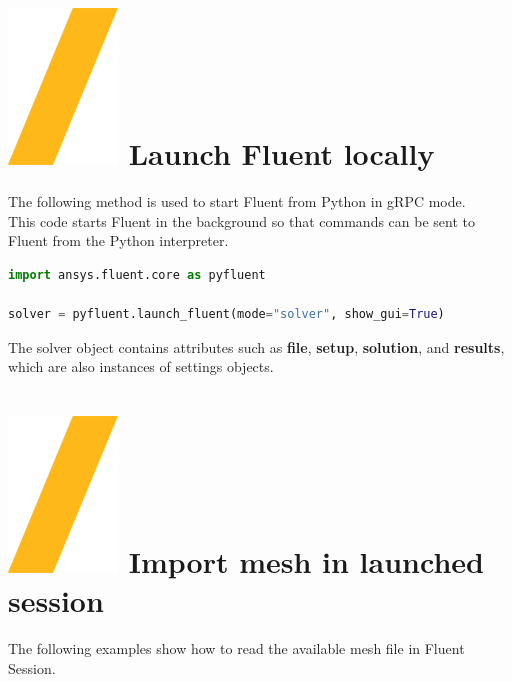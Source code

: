\documentclass[9pt,landscape]{article}
\begin{document}
\begin{multicols}{3}
\setlength{\premulticols}{1pt}
\setlength{\postmulticols}{1pt}
\setlength{\multicolsep}{1pt}
\setlength{\columnsep}{2pt}

\vfill
\section{\includegraphics[height=\fontcharht\font`\S]{slash.png} Launch Fluent locally}
The following method is used to start Fluent from Python in gRPC mode.\\
This code starts Fluent in the background so that commands can be sent to Fluent from the Python interpreter.

\begin{lstlisting}[language=Python]
import ansys.fluent.core as pyfluent

solver = pyfluent.launch_fluent(mode="solver", show_gui=True)
\end{lstlisting}

The solver object contains attributes such as \textbf{file}, \textbf{setup}, \textbf{solution}, and \textbf{results}, 
which are also instances of settings objects. 

\section{\includegraphics[height=\fontcharht\font`\S]{slash.png} Import mesh in launched session}

The following examples show how to read the available mesh file in Fluent Session.


\end{multicols}
\end{document}
